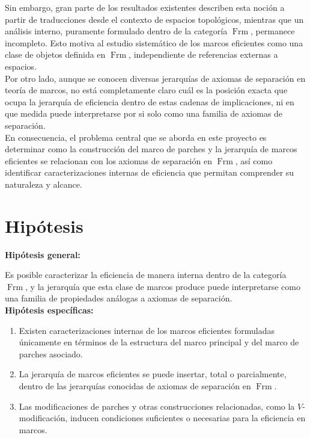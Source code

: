 \documentclass{protocol_template}
\DeclareMathOperator{\Frm}{Frm}
\begin{document}
Sin embargo, gran parte de los resultados existentes describen esta noción a partir de traducciones desde el contexto de espacios 
topológicos, mientras que un análisis interno, puramente formulado dentro de la categoría $\Frm$, permanece incompleto. Esto motiva
al estudio sistemático de los marcos eficientes como una clase de objetos definida en $\Frm$, independiente de referencias externas 
a espacios.\\

Por otro lado, aunque se conocen diversas jerarquías de axiomas de separación en teoría de marcos,
no está completamente claro cuál es la posición exacta que ocupa la jerarquía de eficiencia dentro de estas cadenas de
implicaciones, ni en que medida puede interpretarse por si solo como una familia de axiomas de separación.\\

En consecuencia, el problema central que se aborda en este proyecto es determinar como la construcción del marco de parches y
la jerarquía de marcos eficientes se relacionan con los axiomas de separación en $\Frm$, así como identificar caracterizaciones internas
de eficiencia que permitan comprender su naturaleza y alcance.

\section{Hipótesis}
\textbf{Hipótesis general:}

Es posible caracterizar la eficiencia de manera interna dentro de la categoría $\Frm$, y la jerarquía que esta clase 
de marcos produce puede interpretarse como una familia de propiedades análogas a axiomas de separación.\\

\textbf{Hipótesis específicas:}
 \begin{enumerate}
\item Existen caracterizaciones internas de los marcos eficientes formuladas únicamente en términos de la 
estructura del marco principal y del marco de parches asociado.

\item La jerarquía de marcos eficientes se puede insertar, total o parcialmente, dentro de las 
jerarquías conocidas de axiomas de separación en $\Frm$.

\item Las modificaciones de parches y otras construcciones relacionadas, como la $V$-modificación, inducen
condiciones suficientes o necesarias para la eficiencia en marcos.
\end{enumerate}
\end{document}
